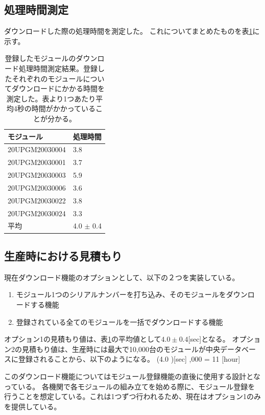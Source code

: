 \subsection{処理時間測定}
ダウンロードした際の処理時間を測定した。
これについてまとめたものを表\ref{download_measurement}に示す。

\begin{table}[tbp]
\begin{center}
\caption[登録したモジュールのダウンロード処理時間測定結果]{登録したモジュールのダウンロード処理時間測定結果。登録したそれぞれのモジュールについてダウンロードにかかる時間を測定した。表より1つあたり平均4秒の時間がかかっていることが分かる。}
\label{download_measurement}
  \begin{tabular}{|ll|} \hline
    モジュール & 処理時間 \\ \hline
    20UPGM20030004 &  3.8 \\ 
    20UPGM20030001 &  3.7 \\ 
    20UPGM20030003 &  5.9 \\ 
    20UPGM20030006 &  3.6 \\ 
    20UPGM20030022 &  3.8 \\ 
    20UPGM20030024 &  3.3 \\ \hline 
    平均           &  4.0 $\pm$ 0.4 \\\hline
  \end{tabular}
\end{center}
\end{table}

\subsection{生産時における見積もり}
現在ダウンロード機能のオプションとして、以下の２つを実装している。
\begin{enumerate}
  \item モジュール1つのシリアルナンバーを打ち込み、そのモジュールをダウンロードする機能
  \item 登録されている全てのモジュールを一括でダウンロードする機能
\end{enumerate}

オプション1の見積もり値は、表\ref{download_measurement}の平均値として$4.0\pm0.4$[sec]となる。
オプション2の見積もり値は、生産時には最大で10,000台のモジュールが中央データベースに登録されることから、以下のようになる。
\bbb
(4.0 )[\rm{sec}] ,000 = 11  [{\rm hour}]
\eee

このダウンロード機能についてはモジュール登録機能の直後に使用する設計となっている。
各機関で各モジュールの組み立てを始める際に、モジュール登録を行うことを想定している。これは1つずつ行われるため、現在はオプション1のみを提供している。

